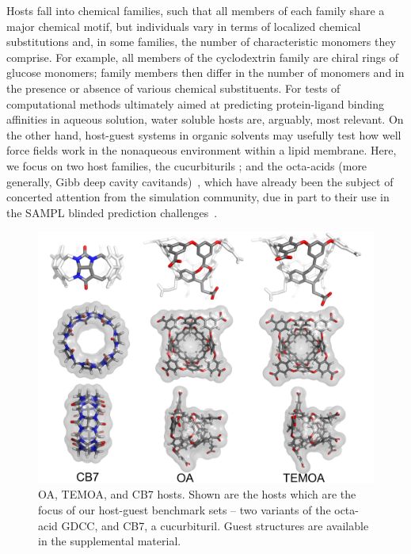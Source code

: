 \documentclass[aps,pre,twocolumn,nofootinbib,superscriptaddress,10pt, final,tightenlines]{revtex4-1}
\begin{document}
Hosts fall into chemical families, such that all members of each family share a major chemical motif, but individuals vary in terms of localized chemical substitutions and, in some families, the number of characteristic monomers they comprise.  
For example, all members of the cyclodextrin family are chiral rings of glucose monomers; family members then differ in the number of monomers and in the presence or absence of various chemical substituents. 
For tests of computational methods ultimately aimed at predicting protein-ligand binding affinities in aqueous solution, water soluble hosts are, arguably, most relevant. 
On the other hand, host-guest systems in organic solvents may usefully test how well force fields work in the nonaqueous environment within a lipid membrane. 
Here, we focus on two host families, the cucurbiturils \cite{freeman_cucurbituril_1981,mock_host-guest_1983}; and the octa-acids (more generally, Gibb deep cavity cavitands)~\cite{gibb_well-defined_2004, hillyer_synthesis_2016}, which have already been the subject of concerted attention from the simulation community, due in part to their use in the SAMPL blinded prediction challenges~\cite{muddana_sampl3_2012, muddana_sampl4_2014, yin_sampl5_preprint}.  

\begin{figure}
\includegraphics[width=\textwidth]{figures/hosts.pdf}
\caption{\label{hosts} OA, TEMOA, and CB7 hosts. Shown are the hosts which are the focus of our host-guest benchmark sets -- two variants of the octa-acid GDCC, and CB7, a cucurbituril. Guest structures are available in the supplemental material.}
\end{figure}
\end{document}

